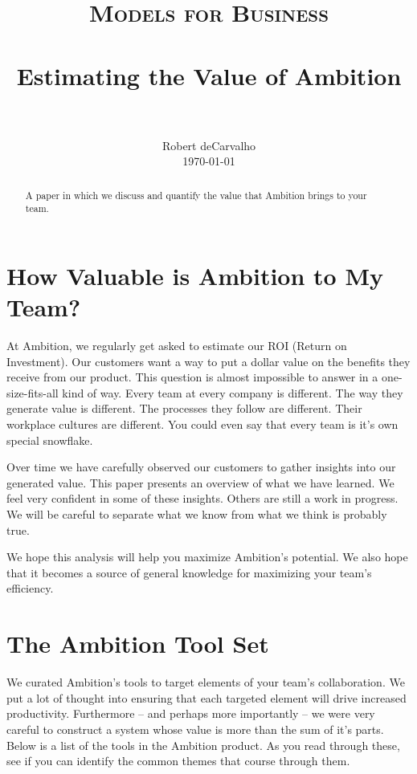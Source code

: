 \documentclass[paper=a4, fontsize=11pt abstract]{scrartcl}
\title{
		\usefont{OT1}{bch}{b}{n}
		\normalfont \normalsize \textsc{Models for Business} \\ [25pt]
		\horrule{0.5pt} \\[0.4cm]
		\huge Estimating the Value of Ambition\\
		\horrule{2pt} \\[0.5cm]
}
\author{
		\normalfont
		\normalsize
        Robert deCarvalho\\[-3pt]
        \normalsize
        \today
}
\date{}
\numberwithin{equation}{section}		%
\numberwithin{figure}{section}			%
\numberwithin{table}{section}				%
\begin{document}
\maketitle


\begin{abstract}
A paper in which we discuss and quantify the value that Ambition brings to your team.
\end{abstract}


\section{How Valuable is Ambition to My Team?}

At Ambition, we regularly get asked to estimate our ROI (Return on Investment).
Our customers want a way to put a dollar value on the benefits they receive from our product.
This question is almost impossible to answer in a one-size-fits-all kind of way.
Every team at every company is different.
The way they generate value is different.
The processes they follow are different.
Their workplace cultures are different.
You could even say that every team is it's own special snowflake.

Over time we have carefully observed our customers to gather insights into our generated value.
This paper presents an overview of what we have learned.
We feel very confident in some of these insights.  
Others are still a work in progress.
We will be careful to separate what we know from what we think is probably true.


We hope this analysis will help you maximize Ambition's potential.
We also hope that it becomes a source of general knowledge for maximizing your team's efficiency.

\section{The Ambition Tool Set}
We curated Ambition's tools to target elements of your team's collaboration.  We put a lot of thought into ensuring that each targeted element will drive increased productivity.
Furthermore -- and perhaps more importantly -- we were very careful to construct a system whose value is more than the sum of it's parts.
Below is a list of the tools in the Ambition product.
As you read through these, see if you can identify the common themes that course through them.
\end{document}
